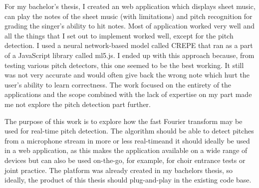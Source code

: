 For my bachelor's thesis, I created an web application which displays sheet music, can play the notes of the sheet music (with limitations) and pitch recognition for grading the singer's ability to hit notes. Most of application worked very well and all the things that I set out to implement worked well, except for the pitch detection. I used a neural network-based model called CREPE that ran as a part of a JavaScript library called ml5.js. I ended up with this approach because, from testing various pitch detectors, this one seemed to be the best working. It still was not very accurate and would often give back the wrong note which hurt the user's ability to learn correctness. The work focused on the entirety of the applications and the scope combined with the lack of expertise on my part made me not explore the pitch detection part further.  

The purpose of this work is to explore how the fast Fourier transform may be used for real-time pitch detection. The algorithm should be able to detect pitches from a microphone stream in more or less real-timeand it should ideally be used in a web application, as this makes the application available on a wide range of devices but can also be used on-the-go, for example, for choir entrance tests or joint practice. The platform was already created in my bachelors thesis, so ideally, the product of this thesis should plug-and-play in the existing code base.



